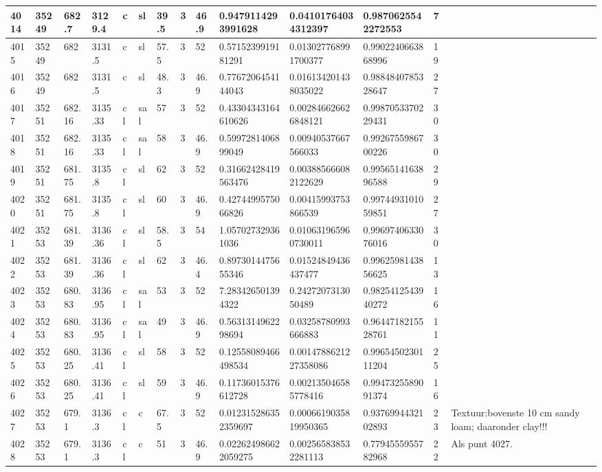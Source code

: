 \documentclass[11pt,a4paper]{article}
\begin{document}
\begin{table}[h]
\begin{tabular}{|l|l|l|l|l|l|l|l|l|l|l|l|l|l|}
4014 & 35249 & 682.7 & 3129.4 & c & sl & 39.5 & 3 & 46.9 & 0.9479114293991628 & 0.04101764034312397 & 0.9870625542272553 & 7 &  \\ \hline
4015 & 35249 & 682 & 3131.5 & c & sl & 57.5 & 3 & 52 & 0.5715239919181291 & 0.013027768991700377 & 0.9902240663868996 & 19 &  \\ \hline
4016 & 35249 & 682 & 3131.5 & c & sl & 48.3 & 3 & 46.9 & 0.7767206454144043 & 0.016134201438035022 & 0.9884840785328647 & 27 &  \\ \hline
4017 & 35251 & 682.16 & 3135.33 & cl & sal & 57 & 3 & 52 & 0.43304343164610626 & 0.002846626626848121 & 0.9987053370229431 & 30 &  \\ \hline
4018 & 35251 & 682.16 & 3135.33 & cl & sal & 58 & 3 & 46.9 & 0.5997281406899049 & 0.00940537667566033 & 0.9926755986700226 & 30 &  \\ \hline
4019 & 35251 & 681.75 & 3135.8 & cl & sl & 62 & 3 & 52 & 0.31662428419563476 & 0.003885666082122629 & 0.9956514163896588 & 29 &  \\ \hline
4020 & 35251 & 681.75 & 3135.8 & cl & sl & 60 & 3 & 46.9 & 0.4274499575066826 & 0.00415993753866539 & 0.9974493101059851 & 27 &  \\ \hline
4021 & 35253 & 681.39 & 3136.36 & cl & sl & 58.5 & 3 & 54 & 1.057027329361036 & 0.010631965960730011 & 0.9969740633076016 & 30 &  \\ \hline
4022 & 35253 & 681.39 & 3136.36 & cl & sl & 62 & 3 & 46.4 & 0.8973014475655346 & 0.01524849436437477 & 0.9962598143856625 & 13 &  \\ \hline
4023 & 35253 & 680.83 & 3136.95 & cl & sal & 53 & 3 & 52 & 7.283426501394322 & 0.2427207313050489 & 0.9825412543940272 & 16 &  \\ \hline
4024 & 35253 & 680.83 & 3136.95 & cl & sal & 49 & 3 & 46.9 & 0.5631314962298694 & 0.03258780993666883 & 0.9644718215528761 & 11 &  \\ \hline
4025 & 35253 & 680.25 & 3136.41 & cl & sl & 58 & 3 & 52 & 0.12558089466498534 & 0.0014788621227358086 & 0.9965450230111204 & 25 &  \\ \hline
4026 & 35253 & 680.25 & 3136.41 & cl & sl & 59 & 3 & 46.9 & 0.11736015376612728 & 0.002135046585778416 & 0.9947325589091374 & 16 &  \\ \hline
4027 & 35253 & 679.1 & 3136.3 & cl & c & 67.5 & 3 & 52 & 0.012315286352359697 & 0.0006619035819950365 & 0.9376994432102893 & 23 & Textuur:bovenste 10 cm sandy loam; daaronder clay!!! \\ \hline
4028 & 35253 & 679.1 & 3136.3 & cl & c & 51 & 3 & 46.9 & 0.022624986622059275 & 0.002565838532281113 & 0.7794555955782968 & 22 & Als punt 4027. \\ \hline

\end{tabular}
\end{table}
\end{document}
